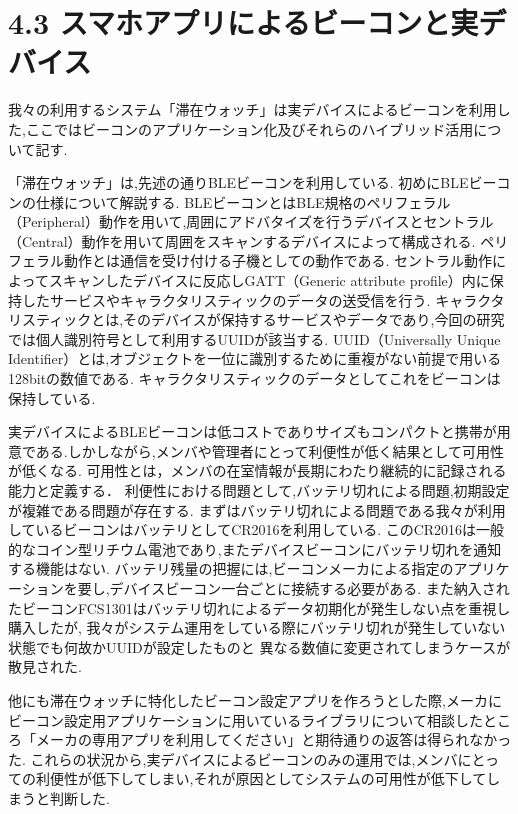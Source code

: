 \section*{4.3 スマホアプリによるビーコンと実デバイス}
我々の利用するシステム「滞在ウォッチ」は実デバイスによるビーコンを利用した,ここではビーコンのアプリケーション化及びそれらのハイブリッド活用について記す.

「滞在ウォッチ」は,先述の通りBLEビーコンを利用している.
初めにBLEビーコンの仕様について解説する.
BLEビーコンとはBLE規格のペリフェラル（Peripheral）動作を用いて,周囲にアドバタイズを行うデバイスとセントラル（Central）動作を用いて周囲をスキャンするデバイスによって構成される.
ペリフェラル動作とは通信を受け付ける子機としての動作である.
セントラル動作によってスキャンしたデバイスに反応しGATT（Generic attribute profile）内に保持したサービスやキャラクタリスティックのデータの送受信を行う.
キャラクタリスティックとは,そのデバイスが保持するサービスやデータであり,今回の研究では個人識別符号として利用するUUIDが該当する.
UUID（Universally Unique Identifier）とは,オブジェクトを一位に識別するために重複がない前提で用いる128bitの数値である.
キャラクタリスティックのデータとしてこれをビーコンは保持している.


実デバイスによるBLEビーコンは低コストでありサイズもコンパクトと携帯が用意である.しかしながら,メンバや管理者にとって利便性が低く結果として可用性が低くなる.
可用性とは，メンバの在室情報が長期にわたり継続的に記録される能力と定義する．
利便性における問題として,バッテリ切れによる問題,初期設定が複雑である問題が存在する.
まずはバッテリ切れによる問題である我々が利用しているビーコンはバッテリとしてCR2016を利用している.
このCR2016は一般的なコイン型リチウム電池であり,またデバイスビーコンにバッテリ切れを通知する機能はない.
バッテリ残量の把握には,ビーコンメーカによる指定のアプリケーションを要し,デバイスビーコン一台ごとに接続する必要がある.
また納入されたビーコンFCS1301はバッテリ切れによるデータ初期化が発生しない点を重視し購入したが,
我々がシステム運用をしている際にバッテリ切れが発生していない状態でも何故かUUIDが設定したものと
異なる数値に変更されてしまうケースが散見された.

他にも滞在ウォッチに特化したビーコン設定アプリを作ろうとした際,メーカにビーコン設定用アプリケーションに用いているライブラリについて相談したところ「メーカの専用アプリを利用してください」と期待通りの返答は得られなかった.
これらの状況から,実デバイスによるビーコンのみの運用では,メンバにとっての利便性が低下してしまい,それが原因としてシステムの可用性が低下してしまうと判断した.




